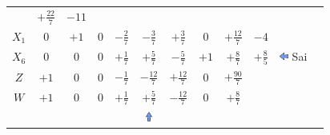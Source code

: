 \documentclass{beamer}
\begin{document}
\begin{frame}
{\begin{table}
\begin{tabular}{c c c c c c c c c c c c}
				& \cellcolor{yellow!50} $\scriptstyle +\frac{22}{7}$
				& $ \scriptstyle -11 $ \\
			    \cellcolor{blue!100} \color{red} $\scriptstyle X_1$
				& \cellcolor{yellow!50} $\scriptstyle 0$
				& \cellcolor{yellow!50} $\scriptstyle +1$
				& \cellcolor{yellow!50} $\scriptstyle 0$
				& \cellcolor{yellow!50} $\scriptstyle -\frac{2}{7}$			
				& \cellcolor{gray!50} $\scriptstyle -\frac{3}{7}$
				& \cellcolor{yellow!50} $\scriptstyle +\frac{3}{7}$
				& \cellcolor{yellow!50} $\scriptstyle 0$ 
				& \cellcolor{yellow!50} $\scriptstyle +\frac{12}{7}$
				& $ \scriptstyle -4 $  \\
				\cellcolor{blue!100} \color{red} $\scriptstyle X_6$
				& \cellcolor{gray!50} $\scriptstyle 0$
				& \cellcolor{gray!50} $\scriptstyle 0$
				& \cellcolor{gray!50} $\scriptstyle 0$
				& \cellcolor{gray!50} $\scriptstyle +\frac{1}{7}$
				& \cellcolor{red!50} $\scriptstyle +\frac{5}{7}$
				& \cellcolor{gray!50} $\scriptstyle -\frac{5}{7}$
				& \cellcolor{gray!50} $\scriptstyle +1$
				& \cellcolor{gray!50} $\scriptstyle +\frac{8}{7}$
				& $ \scriptstyle +\frac{8}{5} $ 
				& \includegraphics[width=0.3cm,height=0.3cm]{setaesquerda.jpg} \scriptsize Sai \\
				\cellcolor{blue!100} \color{white} $\scriptstyle Z$
				& \cellcolor{yellow!50} $\scriptstyle +1$
				& \cellcolor{yellow!50} $\scriptstyle 0$
				& \cellcolor{yellow!50} $\scriptstyle 0$
				& \cellcolor{yellow!50} $\scriptstyle -\frac{1}{7}$
				& \cellcolor{gray!50} $\scriptstyle -\frac{12}{7}$
				& \cellcolor{yellow!50} $\scriptstyle +\frac{12}{7}$
				& \cellcolor{yellow!50} $\scriptstyle 0$ 
				& \cellcolor{yellow!50} $\scriptstyle +\frac{90}{7}$  \\
				\cellcolor{blue!100} \color{white} $\scriptstyle W$
				& \cellcolor{yellow!90} $\scriptstyle +1$
				& \cellcolor{yellow!90} $\scriptstyle 0$
				& \cellcolor{yellow!90} $\scriptstyle 0$
				& \cellcolor{yellow!90} $\scriptstyle +\frac{1}{7}$
				& \cellcolor{gray!50} $\scriptstyle +\frac{5}{7}$
				& \cellcolor{yellow!90} $\scriptstyle -\frac{12}{7}$
				& \cellcolor{yellow!90} $\scriptstyle 0$ 
				& \cellcolor{yellow!90} $\scriptstyle +\frac{8}{7}$  \\
				& & & & & \includegraphics[width=0.3cm,height=0.3cm]{setacima.jpg} \\

\end{tabular}
\end{table}}
\end{frame}
\end{document}

